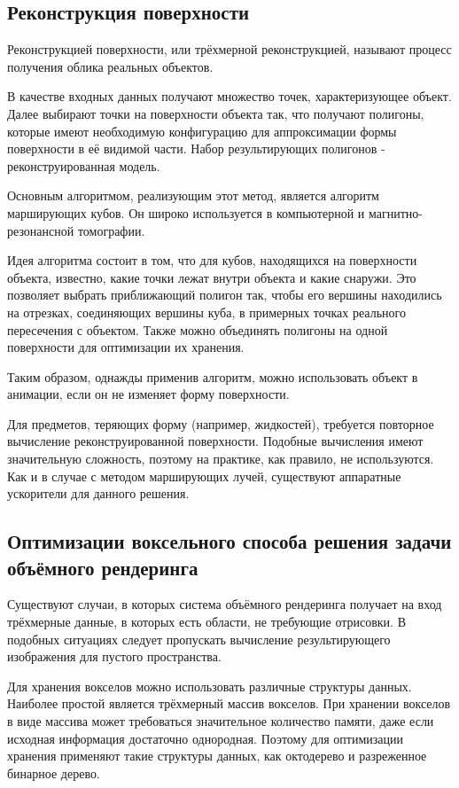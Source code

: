 \subsection{Реконструкция поверхности}

Реконструкцией поверхности, или трёхмерной реконструкцией, называют процесс
получения облика реальных объектов.

В качестве входных данных получают множество точек, характеризующее объект.
Далее выбирают точки на поверхности объекта так, что получают полигоны, которые
имеют необходимую конфигурацию для аппроксимации формы поверхности в её видимой части.
Набор результирующих полигонов - реконструированная модель.

Основным алгоритмом, реализующим этот метод, является алгоритм марширующих кубов.
Он широко используется в компьютерной и магнитно-резонансной томографии\cite{site:marchingcubes}.

Идея алгоритма состоит в том, что для кубов, находящихся на поверхности объекта, известно,
какие точки лежат внутри объекта и какие снаружи. Это позволяет выбрать
приближающий полигон так, чтобы его вершины находились на отрезках, соединяющих вершины куба,
в примерных точках реального пересечения с объектом. Также можно объединять полигоны на одной поверхности
для оптимизации их хранения.

Таким образом, однажды применив алгоритм, можно использовать объект в анимации, если
он не изменяет форму поверхности.

Для предметов, теряющих форму (например, жидкостей), требуется повторное вычисление
реконструированной поверхности. Подобные вычисления имеют значительную сложность,
поэтому на практике, как правило, не используются\cite{book:ash}. Как и в случае
с методом марширующих лучей, существуют аппаратные ускорители для данного решения\cite{site:gvdb}.

\subsection{Оптимизации воксельного способа решения задачи объёмного рендеринга}

Существуют случаи, в которых система объёмного рендеринга получает на вход трёхмерные данные, в
 которых есть области, не требующие отрисовки. В подобных ситуациях следует пропускать вычисление
 результирующего изображения для пустого пространства\cite{article:asvo}.

Для хранения вокселов можно использовать различные структуры данных. Наиболее простой является
трёхмерный массив вокселов. При хранении вокселов в виде массива может требоваться значительное
количество памяти, даже если исходная информация достаточно однородная.
Поэтому для оптимизации хранения применяют такие структуры данных, как октодерево и разреженное бинарное дерево\cite{article:asvo}.

